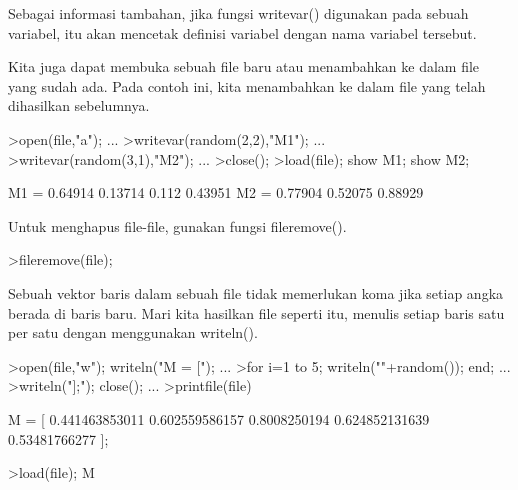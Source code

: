 \documentclass[a4paper,10pt]{article}
\begin{document}
\begin{eulernotebook}
\begin{eulercomment}
\begin{eulercomment}
\begin{eulercomment}
\begin{eulercomment}
\begin{eulercomment}
\begin{eulercomment}
\begin{eulercomment}
Sebagai informasi tambahan, jika fungsi writevar() digunakan pada
sebuah variabel, itu akan mencetak definisi variabel dengan nama
variabel tersebut.
\end{eulercomment}
\begin{eulercomment}
Kita juga dapat membuka sebuah file baru atau menambahkan ke dalam
file yang sudah ada. Pada contoh ini, kita menambahkan ke dalam file
yang telah dihasilkan sebelumnya.
\end{eulercomment}
\begin{eulerprompt}
>open(file,"a"); ...
>writevar(random(2,2),"M1"); ...
>writevar(random(3,1),"M2"); ...
>close();
>load(file); show M1; show M2;
\end{eulerprompt}
\begin{euleroutput}
  M1 = 
    0.64914   0.13714 
      0.112   0.43951 
  M2 = 
    0.77904 
    0.52075 
    0.88929 
\end{euleroutput}
\begin{eulercomment}
Untuk menghapus file-file, gunakan fungsi fileremove().
\end{eulercomment}
\begin{eulerprompt}
>fileremove(file);
\end{eulerprompt}
\begin{eulercomment}
Sebuah vektor baris dalam sebuah file tidak memerlukan koma jika
setiap angka berada di baris baru. Mari kita hasilkan file seperti
itu, menulis setiap baris satu per satu dengan menggunakan writeln().
\end{eulercomment}
\begin{eulerprompt}
>open(file,"w"); writeln("M = ["); ...
>for i=1 to 5; writeln(""+random()); end; ...
>writeln("];"); close(); ...
>printfile(file)
\end{eulerprompt}
\begin{euleroutput}
  M = [
  0.441463853011
  0.602559586157
  0.8008250194
  0.624852131639
  0.53481766277
  ];
\end{euleroutput}
\begin{eulerprompt}
>load(file); M
\end{eulerprompt}

\end{eulercomment}
\end{eulercomment}
\end{eulercomment}
\end{eulercomment}
\end{eulercomment}
\end{eulercomment}
\end{eulernotebook}
\end{document}
